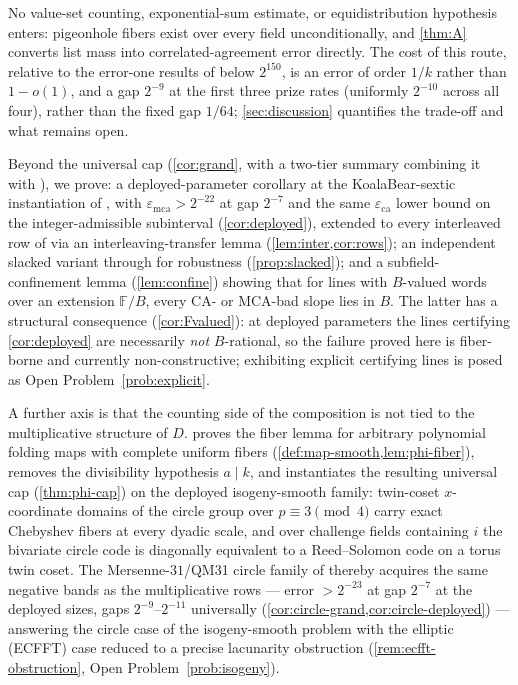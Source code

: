 \documentclass[11pt]{article}
\theoremstyle{definition}
\theoremstyle{remark}
\newcommand{\F}{\mathbb{F}}
\newcommand{\B}{B}
\newcommand{\eca}{\varepsilon_{\mathrm{ca}}}
\newcommand{\emca}{\varepsilon_{\mathrm{mca}}}
\begin{document}
No value-set counting, exponential-sum estimate, or equidistribution hypothesis enters: pigeonhole fibers exist over every field unconditionally, and \cref{thm:A} converts list mass into correlated-agreement error directly. The cost of this route, relative to the error-one results of \cite{Cho26a,Cho26b} below $2^{150}$, is an error of order $1/k$ rather than $1-o(1)$, and a gap $2^{-9}$ at the first three prize rates (uniformly $2^{-10}$ across all four), rather than the fixed gap $1/64$; \cref{sec:discussion} quantifies the trade-off and what remains open.

Beyond the universal cap (\cref{cor:grand}, with a two-tier summary combining it with \cite{Cho26b}), we prove: a deployed-parameter corollary at the KoalaBear-sextic instantiation of \cite[\S6.3]{ABF26}, with $\emca>2^{-22}$ at gap $2^{-7}$ and the same $\eca$ lower bound on the integer-admissible subinterval (\cref{cor:deployed}), extended to every interleaved row of \cite[Tables~2--3]{ABF26} via an interleaving-transfer lemma (\cref{lem:inter,cor:rows}); an independent slacked variant through \cite[Thm.~1.9]{BCHKS25} for robustness (\cref{prop:slacked}); and a subfield-confinement lemma (\cref{lem:confine}) showing that for lines with $\B$-valued words over an extension $\F/\B$, every CA- or MCA-bad slope lies in $\B$. The latter has a structural consequence (\cref{cor:Fvalued}): at deployed parameters the lines certifying \cref{cor:deployed} are necessarily \emph{not} $\B$-rational, so the failure proved here is fiber-borne and currently non-constructive; exhibiting explicit certifying lines is posed as Open Problem~\ref{prob:explicit}.

A further axis is that the counting side of the composition is not tied to the multiplicative structure of $D$.  proves the fiber lemma for arbitrary polynomial folding maps with complete uniform fibers (\cref{def:map-smooth,lem:phi-fiber}), removes the divisibility hypothesis $a\mid k$, and instantiates the resulting universal cap (\cref{thm:phi-cap}) on the deployed isogeny-smooth family: twin-coset $x$-coordinate domains of the circle group over $p\equiv3\pmod4$ carry exact Chebyshev fibers at every dyadic scale, and over challenge fields containing $i$ the bivariate circle code is diagonally equivalent to a Reed--Solomon code on a torus twin coset. The Mersenne-$31$/QM31 circle family of \cite{HLP24} thereby acquires the same negative bands as the multiplicative rows --- error $>2^{-23}$ at gap $2^{-7}$ at the deployed sizes, gaps $2^{-9}$--$2^{-11}$ universally (\cref{cor:circle-grand,cor:circle-deployed}) --- answering the circle case of the isogeny-smooth problem with the elliptic (ECFFT) case reduced to a precise lacunarity obstruction (\cref{rem:ecfft-obstruction}, Open Problem~\ref{prob:isogeny}).
\end{document}
